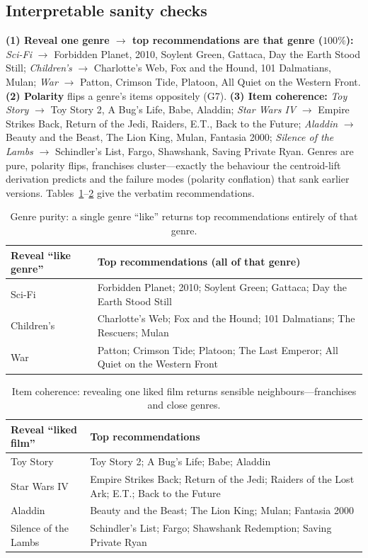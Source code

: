 \subsection{Interpretable sanity checks}\label{sec:sanity}
\textbf{(1) Reveal one genre $\to$ top recommendations are that genre ($100\%$):} \emph{Sci-Fi} $\to$ Forbidden
Planet, 2010, Soylent Green, Gattaca, Day the Earth Stood Still; \emph{Children's} $\to$ Charlotte's Web, Fox and
the Hound, 101 Dalmatians, Mulan; \emph{War} $\to$ Patton, Crimson Tide, Platoon, All Quiet on the Western Front.
\textbf{(2) Polarity} flips a genre's items oppositely (G7). \textbf{(3) Item coherence:} \emph{Toy Story} $\to$
Toy Story 2, A Bug's Life, Babe, Aladdin; \emph{Star Wars IV} $\to$ Empire Strikes Back, Return of the Jedi,
Raiders, E.T., Back to the Future; \emph{Aladdin} $\to$ Beauty and the Beast, The Lion King, Mulan, Fantasia 2000;
\emph{Silence of the Lambs} $\to$ Schindler's List, Fargo, Shawshank, Saving Private Ryan. Genres are pure,
polarity flips, franchises cluster---exactly the behaviour the centroid-lift derivation predicts and the failure
modes (polarity conflation) that sank earlier versions. Tables~\ref{tab:genretitles}--\ref{tab:coh} give the
verbatim recommendations.

\begin{table}[h]\centering\small
\begin{tabular}{l p{10.2cm}}
\toprule
Reveal ``like genre'' & Top recommendations (all of that genre)\\
\midrule
Sci-Fi & Forbidden Planet; 2010; Soylent Green; Gattaca; Day the Earth Stood Still\\
Children's & Charlotte's Web; Fox and the Hound; 101 Dalmatians; The Rescuers; Mulan\\
War & Patton; Crimson Tide; Platoon; The Last Emperor; All Quiet on the Western Front\\
\bottomrule
\end{tabular}
\caption{Genre purity: a single genre ``like'' returns top recommendations entirely of that genre.}
\label{tab:genretitles}
\end{table}

\begin{table}[h]\centering\small
\begin{tabular}{l p{10.2cm}}
\toprule
Reveal ``liked film'' & Top recommendations\\
\midrule
Toy Story & Toy Story 2; A Bug's Life; Babe; Aladdin\\
Star Wars IV & Empire Strikes Back; Return of the Jedi; Raiders of the Lost Ark; E.T.; Back to the Future\\
Aladdin & Beauty and the Beast; The Lion King; Mulan; Fantasia 2000\\
Silence of the Lambs & Schindler's List; Fargo; Shawshank Redemption; Saving Private Ryan\\
\bottomrule
\end{tabular}
\caption{Item coherence: revealing one liked film returns sensible neighbours---franchises and close genres.}
\label{tab:coh}
\end{table}

